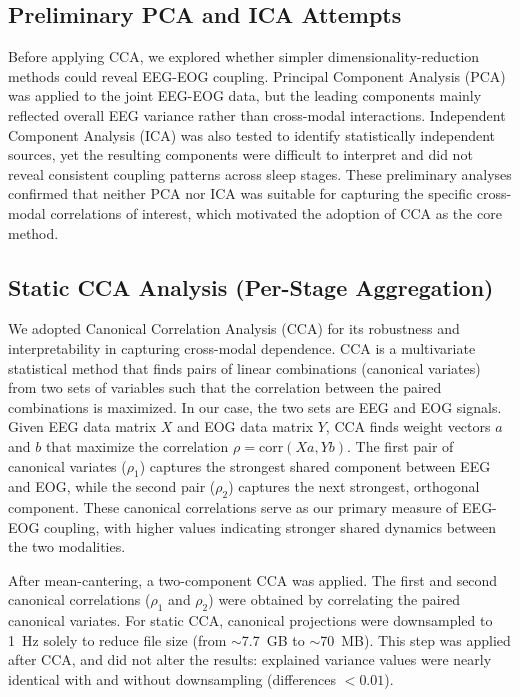 \subsection{Preliminary PCA and ICA Attempts}

Before applying CCA, we explored whether simpler dimensionality-reduction methods could reveal EEG-EOG coupling. Principal Component Analysis (PCA) was applied to the joint EEG-EOG data, but the leading components mainly reflected overall EEG variance rather than cross-modal interactions. Independent Component Analysis (ICA) was also tested to identify statistically independent sources, yet the resulting components were difficult to interpret and did not reveal consistent coupling patterns across sleep stages. These preliminary analyses confirmed that neither PCA nor ICA was suitable for capturing the specific cross-modal correlations of interest, which motivated the adoption of CCA as the core method.

\subsection{Static CCA Analysis (Per-Stage Aggregation)}

We adopted Canonical Correlation Analysis (CCA) for its robustness and interpretability in capturing cross-modal dependence. CCA is a multivariate statistical method that finds pairs of linear combinations (canonical variates) from two sets of variables such that the correlation between the paired combinations is maximized. In our case, the two sets are EEG and EOG signals. Given EEG data matrix $X$ and EOG data matrix $Y$, CCA finds weight vectors $a$ and $b$ that maximize the correlation $\rho = \mathrm{corr}(Xa, Yb)$. The first pair of canonical variates ($\rho_1$) captures the strongest shared component between EEG and EOG, while the second pair ($\rho_2$) captures the next strongest, orthogonal component. These canonical correlations serve as our primary measure of EEG-EOG coupling, with higher values indicating stronger shared dynamics between the two modalities.

After mean-cantering, a two-component CCA was applied. The first and second canonical correlations ($\rho_1$ and $\rho_2$) were obtained by correlating the paired canonical variates. For static CCA, canonical projections were downsampled to 1~Hz solely to reduce file size (from $\sim$7.7~GB to $\sim$70~MB). This step was applied after CCA, and did not alter the results: explained variance values were nearly identical with and without downsampling (differences $<0.01$). %

